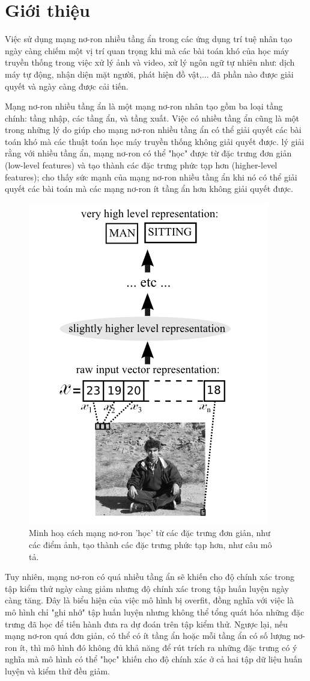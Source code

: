 \chapter{Giới thiệu}
\label{Chapter1}

Việc sử dụng mạng nơ-ron nhiều tầng ẩn trong các ứng dụng trí tuệ nhân tạo ngày càng chiếm một vị trí quan trọng khi mà các bài toán khó của học máy truyền thống trong việc xử lý ảnh và video, xử lý ngôn ngữ tự nhiên như: dịch máy tự động, nhận diện mặt người, phát hiện đồ vật,... đã phần nào được giải quyết và ngày càng được cải tiến.

Mạng nơ-ron nhiều tầng ẩn là một mạng nơ-ron nhân tạo gồm ba loại tầng chính: tầng nhập, các tầng ẩn, và tầng xuất. Việc có nhiều tầng ẩn cũng là một trong những lý do giúp cho mạng nơ-ron nhiều tầng ẩn có thể giải quyết các bài toán khó mà các thuật toán học máy truyền thống không giải quyết được. \parencite{bengio2007scaling} lý giải rằng với nhiều tầng ẩn, mạng nơ-ron có thể "học" được từ đặc trưng đơn giản (low-level features) và tạo thành các đặc trưng phức tạp hơn (higher-level features); \parencite{bengio2009learning} cho thấy sức mạnh của mạng nơ-ron nhiều tầng ẩn khi nó có thể giải quyết các bài toán mà các mạng nơ-ron ít tầng ẩn hơn không giải quyết được.

\begin{figure}[htp]
\centering
\includegraphics[width=65 mm]{images/layers-features.png}
\caption{Minh hoạ cách mạng nơ-ron 'học' từ các đặc trưng đơn giản, như các điểm ảnh, tạo thành các đặc trưng phức tạp hơn, như câu mô tả. \parencite{bengio2009learning}}
\label{fig:layers-features}
\end{figure}

Tuy nhiên, mạng nơ-ron có quá nhiều tầng ẩn sẽ khiến cho độ chính xác trong tập kiểm thử ngày càng giảm nhưng độ chính xác trong tập huấn luyện ngày càng tăng. Đây là biểu hiện của việc mô hình bị overfit, đồng nghĩa với việc là mô hình chỉ "ghi nhớ" tập huấn luyện nhưng không thể tổng quát hóa những đặc trưng đã học để tiến hành đưa ra dự đoán trên tập kiểm thử. Ngược lại, nếu mạng nơ-ron quá đơn giản, có thể có ít tầng ẩn hoặc mỗi tầng ẩn có số lượng nơ-ron ít, thì mô hình đó không đủ khả năng để rút trích ra những đặc trưng có ý nghĩa mà mô hình có thể "học" khiến cho độ chính xác ở cả hai tập dữ liệu huấn luyện và kiểm thử đều giảm.

